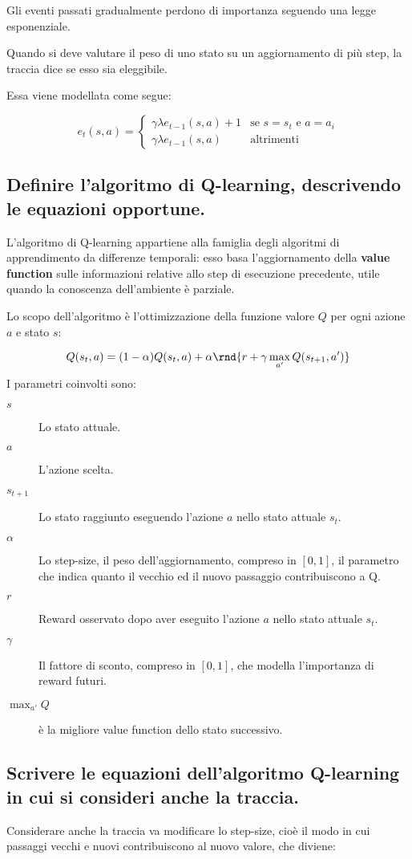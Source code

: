 \documentclass[\main/main.tex]{subfiles}
\begin{document}
Gli eventi passati gradualmente perdono di importanza seguendo una legge esponenziale.

Quando si deve valutare il peso di uno stato su un aggiornamento di più step, la traccia dice se esso sia eleggibile.

Essa viene modellata come segue:

\[
  e_t(s,a) = \begin{cases}
    \gamma \lambda e_{t-1} (s,a) + 1 & \text{se } s=s_t \text{ e } a = a_i \\
    \gamma \lambda e_{t-1} (s,a)     & \text{altrimenti}
  \end{cases}
\]

\subsection{Definire l'algoritmo di Q-learning, descrivendo le equazioni opportune.}
L'algoritmo di Q-learning appartiene alla famiglia degli algoritmi di apprendimento da differenze temporali: esso basa l'aggiornamento della \textbf{value function} sulle informazioni relative allo step di esecuzione precedente, utile quando la conoscenza dell'ambiente è parziale.

Lo scopo dell'algoritmo è l'ottimizzazione della funzione valore $Q$ per ogni azione $a$ e stato $s$:

\[
  Q(s_t,a) = (1-\alpha)Q(s_t,a) + \alpha\rnd{r+\gamma\max_{a'}Q(s_{t+1},a')}
\]
I parametri coinvolti sono:
\begin{description}
  \item[$s$] Lo stato attuale.
  \item[$a$] L'azione scelta.
  \item[$s_{t+1}$] Lo stato raggiunto eseguendo l'azione $a$ nello stato attuale $s_t$.
  \item[$\alpha$] Lo step-size, il peso dell'aggiornamento, compreso in $[0,1]$, il parametro che indica quanto il vecchio ed il nuovo passaggio contribuiscono a Q.
  \item[$r$] Reward osservato dopo aver eseguito l'azione $a$ nello stato attuale $s_t$.
  \item[$\gamma$] Il fattore di sconto, compreso in $[0,1]$, che modella l'importanza di reward futuri.
  \item[$\max_{a'}Q$] è la migliore value function dello stato successivo.
\end{description}

\subsection{Scrivere le equazioni dell'algoritmo Q-learning in cui si consideri anche la traccia.}
Considerare anche la traccia va modificare lo step-size, cioè il modo in cui passaggi vecchi e nuovi contribuiscono al nuovo valore, che diviene:
\end{document}
